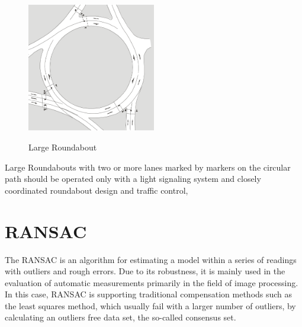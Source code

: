 \begin{figure}[!ht]
\caption{Large Roundabout \cite{man06}}
\includegraphics[width=0.5\textwidth]{bilder/large_roundabout.png} %
\label{roundabout_large}
\end{figure}

Large Roundabouts with two or more lanes marked by markers on the circular path should be operated only with a light signaling system and closely coordinated roundabout design and traffic control,


\section{\acl{RANSAC}}

The \ac{RANSAC} \cite{Fischler1981} is an algorithm for estimating a model within a series of readings with outliers and rough errors. Due to its robustness, 
it is mainly used in the evaluation of automatic measurements primarily in the field of image processing. 
In this case, \ac{RANSAC} is supporting traditional compensation methods such as the least squares method, which usually fail with a larger number of outliers,
by calculating an outliers free data set, the so-called consensus set. 


